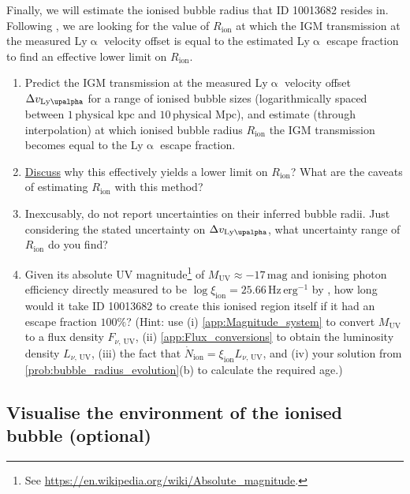 \documentclass{article}
\newcommand{\Lya}{{Ly\ensuremath{\upalpha}}\xspace}
\theoremstyle{definition}
\begin{document}
Finally, we will estimate the ionised bubble radius that ID 10013682 resides in. Following \citet{2024A&A...682A..40W}, we are looking for the value of $R_\text{ion}$ at which the IGM transmission at the measured \Lya velocity offset is equal to the estimated \Lya escape fraction to find an effective lower limit on $R_\text{ion}$.
\begin{enumerate}[label=(\alph*)]
    \item Predict the IGM transmission at the measured \Lya velocity offset $\Delta v_\text{\Lya}$ for a range of ionised bubble sizes (logarithmically spaced between $1 \, \text{physical kpc}$ and $10 \, \text{physical Mpc}$), and estimate (through interpolation) at which ionised bubble radius $R_\text{ion}$ the IGM transmission becomes equal to the \Lya escape fraction.
    \item \underline{Discuss} why this effectively yields a lower limit on $R_\text{ion}$? What are the caveats of estimating $R_\text{ion}$ with this method?
    \item Inexcusably, \citet{2024A&A...682A..40W} do not report uncertainties on their inferred bubble radii. Just considering the stated uncertainty on $\Delta v_\text{\Lya}$, what uncertainty range of $R_\text{ion}$ do you find?
    \item Given its absolute UV magnitude\footnote{See \url{https://en.wikipedia.org/wiki/Absolute_magnitude}.} of $M_\text{UV} \approx -17 \, \mathrm{mag}$ and ionising photon efficiency directly measured to be $\log \xi_\text{ion} = 25.66 \, \mathrm{Hz \, erg^{-1}}$ by \citet{2024A&A...684A..84S}, how long would it take ID 10013682 to create this ionised region itself if it had an escape fraction $100\%$? (Hint: use (i) \cref{app:Magnitude_system} to convert $M_\text{UV}$ to a flux density $F_{\nu, \, \text{UV}}$, (ii) \cref{app:Flux_conversions} to obtain the luminosity density $L_{\nu, \, \text{UV}}$, (iii) the fact that $\dot{N}_\text{ion} = \xi_\text{ion} L_{\nu, \, \text{UV}}$, and (iv) your solution from \cref{prob:bubble_radius_evolution}(b) to calculate the required age.)
\end{enumerate}

\subsection{Visualise the environment of the ionised bubble (optional)}
\end{document}
